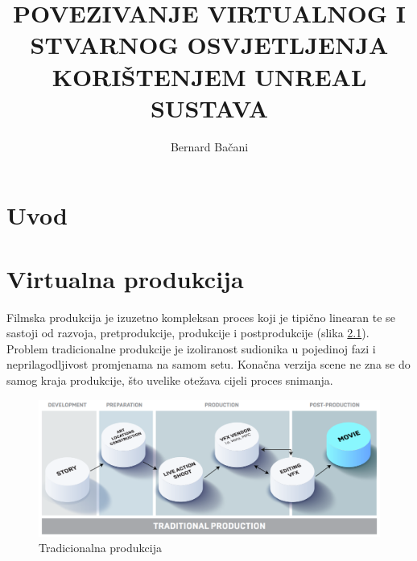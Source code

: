 \documentclass[times, utf8, zavrsni, numeric]{fer}
\begin{document}

\title{POVEZIVANJE VIRTUALNOG I STVARNOG OSVJETLJENJA KORIŠTENJEM UNREAL SUSTAVA}

\author{Bernard Bačani}

\maketitle

\izvornik


\tableofcontents

\chapter{Uvod}

\chapter{Virtualna produkcija}
Filmska produkcija je izuzetno kompleksan proces koji je tipično linearan te se sastoji od razvoja, pretprodukcije, produkcije i postprodukcije (slika \ref{fig:slika 2-1}). Problem tradicionalne produkcije je izoliranost sudionika u pojedinoj fazi i neprilagodljivost promjenama na samom setu. Konačna verzija scene ne zna se do samog kraja produkcije, što uvelike otežava cijeli proces snimanja.\newline

\begin{figure}[htp]
	\centering
	\includegraphics[width=\linewidth]{slika 2-1.png}
	\caption{Tradicionalna produkcija \cite{vpguide1}}
	\label{fig:slika 2-1}
\end{figure}
\end{document}
